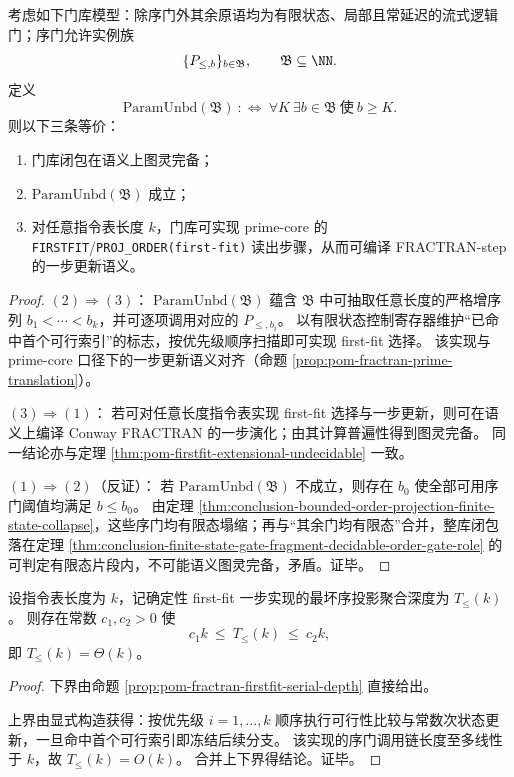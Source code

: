 \begin{theorem}[序投影参数无界性与图灵完备分界]\label{thm:conclusion-order-parameter-unboundedness-turing-completeness}
考虑如下门库模型：除序门外其余原语均为有限状态、局部且常延迟的流式逻辑门；序门允许实例族
\[
\{P_{\le,b}\}_{b\in\mathfrak B},\qquad \mathfrak B\subseteq\NN.
\]
定义
\[
\mathrm{ParamUnbd}(\mathfrak B)
\ :\Longleftrightarrow\
\forall K\ \exists b\in\mathfrak B\ \text{使}\ b\ge K.
\]
则以下三条等价：
\begin{enumerate}
  \item 门库闭包在语义上图灵完备；
  \item \(\mathrm{ParamUnbd}(\mathfrak B)\) 成立；
  \item 对任意指令表长度 \(k\)，门库可实现 prime-core 的 \texttt{FIRSTFIT}/\texttt{PROJ\_ORDER(first-fit)} 读出步骤，从而可编译 FRACTRAN-step 的一步更新语义。
\end{enumerate}
\end{theorem}
\begin{proof}
\((2)\Rightarrow(3)\)：
\(\mathrm{ParamUnbd}(\mathfrak B)\) 蕴含 \(\mathfrak B\) 中可抽取任意长度的严格增序列 \(b_1<\cdots<b_k\)，并可逐项调用对应的 \(P_{\le,b_i}\)。
以有限状态控制寄存器维护“已命中首个可行索引”的标志，按优先级顺序扫描即可实现 first-fit 选择。
该实现与 prime-core 口径下的一步更新语义对齐（命题 \ref{prop:pom-fractran-prime-translation}）。

\((3)\Rightarrow(1)\)：
若可对任意长度指令表实现 first-fit 选择与一步更新，则可在语义上编译 Conway FRACTRAN 的一步演化；由其计算普遍性得到图灵完备。
同一结论亦与定理 \ref{thm:pom-firstfit-extensional-undecidable} 一致。

\((1)\Rightarrow(2)\)（反证）：
若 \(\mathrm{ParamUnbd}(\mathfrak B)\) 不成立，则存在 \(b_0\) 使全部可用序门阈值均满足 \(b\le b_0\)。
由定理 \ref{thm:conclusion-bounded-order-projection-finite-state-collapse}，这些序门均有限态塌缩；再与“其余门均有限态”合并，整库闭包落在定理 \ref{thm:conclusion-finite-state-gate-fragment-decidable-order-gate-role} 的可判定有限态片段内，不可能语义图灵完备，矛盾。证毕。
\end{proof}

\begin{proposition}\label{prop:conclusion-firstfit-serial-depth-theta-k}
设指令表长度为 \(k\)，记确定性 first-fit 一步实现的最坏序投影聚合深度为 \(T_{\le}(k)\)。
则存在常数 \(c_1,c_2>0\) 使
\[
c_1k\ \le\ T_{\le}(k)\ \le\ c_2k,
\]
即 \(T_{\le}(k)=\Theta(k)\)。
\end{proposition}
\begin{proof}
下界由命题 \ref{prop:pom-fractran-firstfit-serial-depth} 直接给出。

上界由显式构造获得：按优先级 \(i=1,\dots,k\) 顺序执行可行性比较与常数次状态更新，一旦命中首个可行索引即冻结后续分支。
该实现的序门调用链长度至多线性于 \(k\)，故 \(T_{\le}(k)=O(k)\)。
合并上下界得结论。证毕。
\end{proof}

